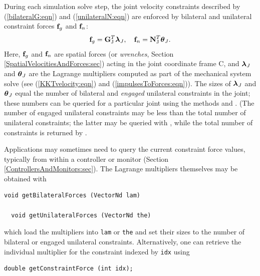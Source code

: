 During each simulation solve step, the joint velocity constraints
described by (\ref{bilateralG:eqn}) and (\ref{unilateralN:eqn}) are
enforced by bilateral and unilateral constraint forces ${\bf f}_g$ and
${\bf f}_n$:
%
\begin{equation}
{\bf f}_g = {\bf G}_\text{J}^T \boldsymbol\lambda_J, \quad {\bf f}_n = {\bf N}_\text{J}^T \boldsymbol\theta_J.
\end{equation}
%
Here, ${\bf f}_g$ and ${\bf f}_n$ are spatial forces (or {\it wrenches}, Section
\ref{SpatialVelocitiesAndForces:sec}) acting in the joint coordinate
frame C, and $\boldsymbol\lambda_J$ and $\boldsymbol\theta_J$ are the Lagrange multipliers
computed as part of the mechanical system solve (see
(\ref{KKTvelocity:eqn}) and (\ref{impulsesToForces:eqn})).  The sizes
of $\boldsymbol\lambda_J$ and $\boldsymbol\theta_J$ equal the number of bilateral and {\it
engaged} unilateral constraints in the joint; these numbers can be
queried for a particular joint using the methods
and
.
(The number of engaged unilateral constraints may be less than the
total number of unilateral constraints; the latter may be queried with
,
while the total number of
constraints is returned by
.

Applications may sometimes need to query the current constraint force
values, typically from within a controller
or monitor (Section \ref{ControllersAndMonitors:sec}).
The Lagrange multipliers themselves may be obtained with
%
\begin{lstlisting}[]
  void getBilateralForces (VectorNd lam)

  void getUnilateralForces (VectorNd the)
\end{lstlisting}
%
which load the multipliers into {\tt lam} or {\tt the} and set their
sizes to the number of bilateral or engaged unilateral
constraints. Alternatively, one can retrieve the individual multiplier
for the constraint indexed by {\tt idx} using
%
\begin{lstlisting}[]
  double getConstraintForce (int idx);
\end{lstlisting}
%

